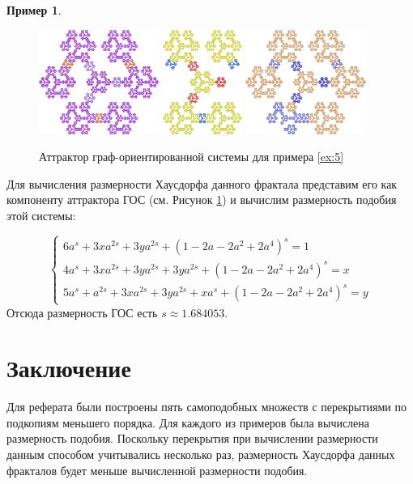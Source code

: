 \documentclass[a4paper,14pt]{extarticle} %
\newcommand{\0}{\varnothing}
\newcommand{\8}{\infty}
\theoremstyle{definition}
\newtheorem{example}{Пример}
\begin{document}
\begin{example}
\begin{figure}[H]
    \centering
    \includegraphics[width=0.35\textwidth]{EXTREME_5.1.png}
    \hfill
    \includegraphics[width=0.23\textwidth]{EXTREME_5.2.png}
    \hfill
    \includegraphics[width=0.35\textwidth]{EXTREME_5.3.png}
    \caption{Аттрактор граф-ориентированной системы для примера \ref{ex:5}}
    \label{fig:primer5}
\end{figure}

Для вычисления размерности Хаусдорфа данного фрактала представим его как компоненту аттрактора ГОС (см. Рисунок \ref{fig:primer5}) и вычислим размерность подобия этой системы:

$$
\begin{cases}
6a^s+3xa^{2s}+3ya^{2s}+(1-2a-2a^2+2a^4)^s=1\\
4a^s+3xa^{2s}+3ya^{2s}+3ya^{2s}+(1-2a-2a^2+2a^4)^s=x\\
5a^s+a^{2s}+3xa^{2s}+3ya^{2s}+xa^s+(1-2a-2a^2+2a^4)^s=y
\end{cases}
$$
Отсюда размерность ГОС есть $s\approx1.684053$.
\end{example}

\newpage
\section*{Заключение}
Для реферата были построены пять самоподобных множеств с перекрытиями по подкопиям меньшего порядка. 
Для каждого из примеров была вычислена размерность подобия. Поскольку перекрытия при вычислении размерности данным способом учитывались несколько раз, размерность Хаусдорфа данных фракталов будет меньше вычисленной размерности подобия.
\end{document}
